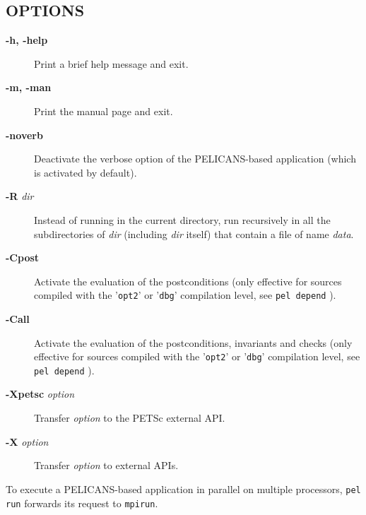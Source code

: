 \documentclass{article}
\begin{document}
\subsection*{OPTIONS\label{run_OPTIONS}}
\begin{description}

\item[\textbf{-h, -help}] \mbox{}

Print a brief help message and exit.


\item[\textbf{-m, -man}] \mbox{}

Print the manual page and exit.


\item[\textbf{-noverb}] \mbox{}

Deactivate the verbose option of the PELICANS-based application
(which is activated by default).


\item[\textbf{-R} \emph{dir}] \mbox{}

Instead of running in the current directory, run recursively in
all the subdirectories of \emph{dir} (including \emph{dir} itself)
that contain a file of name \emph{data}.


\item[\textbf{-Cpost}] \mbox{}

Activate the evaluation of the postconditions (only effective
for sources compiled with the '\texttt{opt2}' or '\texttt{dbg}' compilation level, 
see \texttt{pel depend} ).


\item[\textbf{-Call}] \mbox{}

Activate the evaluation of the postconditions, invariants and
checks (only effective
for sources compiled with the '\texttt{opt2}' or '\texttt{dbg}' compilation level,
see \texttt{pel depend} ).


\item[\textbf{-Xpetsc} \emph{option}] \mbox{}

Transfer \emph{option} to the PETSc external API.


\item[\textbf{-X} \emph{option}] \mbox{}

Transfer \emph{option} to external APIs.

\end{description}


To execute a PELICANS-based application in parallel on
multiple processors, \texttt{pel run} forwards its request
to \texttt{mpirun}.
\end{document}
